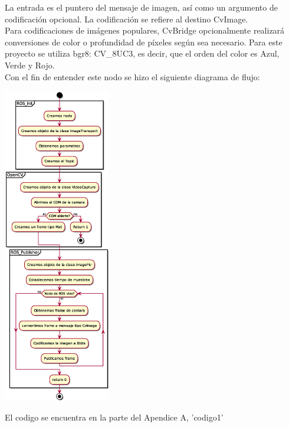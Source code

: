 La entrada es el puntero del mensaje de imagen, así como un argumento de
codificación opcional. La codificación se refiere al destino CvImage.\\
Para codificaciones de imágenes populares, CvBridge opcionalmente realizará
conversiones de color o profundidad de píxeles según sea necesario. Para este proyecto
se utiliza bgr8: CV\_8UC3, es decir, que el orden del color es Azul, Verde y Rojo.\\
Con el fin de entender este nodo se hizo el siguiente diagrama de flujo:
\begin{center}
	\includegraphics[width=0.35\textwidth]{Contenido/Cuerpo/Capitulo4/publisher.eps}
	\label{Fig5}
\end{center}
El codigo se encuentra en la parte del Apendice A, 'codigo1'

